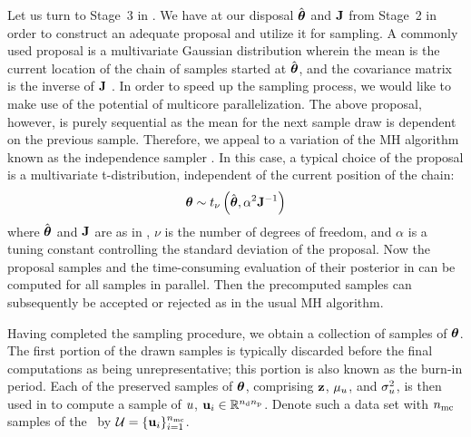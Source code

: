 Let us turn to Stage~3 in .
We have at our disposal $\hat{{\boldsymbol\theta}}$ and $\mathbf{J}$ from Stage~2 in order to construct an adequate proposal and utilize it for sampling.
A commonly used proposal is a multivariate Gaussian distribution wherein the mean is the current location of the chain of samples started at $\hat{{\boldsymbol\theta}}$, and the covariance matrix is the inverse of $\mathbf{J}$ \cite{gelman2004, bernardo2007}.
In order to speed up the sampling process, we would like to make use of the potential of multicore parallelization.
The above proposal, however, is purely sequential as the mean for the next sample draw is dependent on the previous sample.
Therefore, we appeal to a variation of the MH algorithm known as the independence sampler \cite{gelman2004}.
In this case, a typical choice of the proposal is a multivariate t-distribution, independent of the current position of the chain:
\begin{equation} \elabel{proposal}
  \vparam \sim \studentst{\nu}{\hat{\vparam}}{\alpha^2 \mOI^{-1}}
\end{equation}
where $\hat{{\boldsymbol\theta}}$ and $\mathbf{J}$ are as in , $\nu$ is the number of degrees of freedom, and $\alpha$ is a tuning constant controlling the standard deviation of the proposal.
Now the proposal samples and the time-consuming evaluation of their posterior in  can be computed for all samples in parallel.
Then the precomputed samples can subsequently be accepted or rejected as in the usual MH algorithm.

Having completed the sampling procedure, we obtain a collection of samples of ${\boldsymbol\theta}$. The first portion of the drawn samples is typically discarded before the final computations as being unrepresentative; this portion is also known as the burn-in period.
Each of the preserved samples of ${\boldsymbol\theta}$, comprising $\mathbf{z}$, $\mu_u$, and $\sigma^2_u$, is then used in  to compute a sample of $u$, $\mathbf{u}_i \in \mathbb{R}^{{n_\text{d}} {n_\text{p}}}$.
Denote such a data set with ${n_\text{mc}}$ samples of the \qoi\ by $\mathcal{U} = \{ \mathbf{u}_i \}_{i = 1}^{n_\text{mc}}$.

